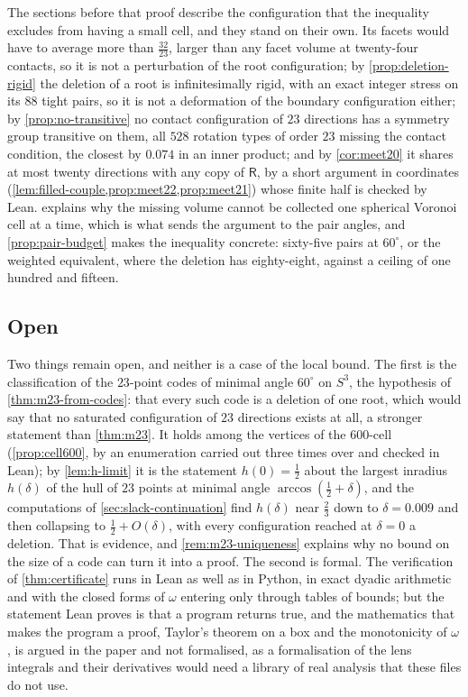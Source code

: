\documentclass[11pt,reqno]{amsart}
\renewcommand{\_}{\origunderscore\allowbreak}
\numberwithin{equation}{section}
\theoremstyle{plain}
\theoremstyle{definition}
\theoremstyle{remark}
\newcommand{\Rt}{\mathsf{R}}                 %
\begin{document}
The sections before that proof describe the configuration that the
inequality excludes from having a small cell, and they stand on their
own. Its facets would have to average more than $\tfrac{32}{23}$, larger
than any facet volume at twenty-four contacts, so it is not a
perturbation of the root configuration; by \cref{prop:deletion-rigid}
the deletion of a root is infinitesimally rigid, with an exact integer
stress on its $88$ tight pairs, so it is not a deformation of the
boundary configuration either; by \cref{prop:no-transitive} no contact
configuration of $23$ directions has a symmetry group transitive on
them, all $528$ rotation types of order $23$ missing the contact
condition, the closest by $0.074$ in an inner product; and by
\cref{cor:meet20} it shares at most twenty directions with any copy of
$\Rt$, by a short argument in coordinates
(\cref{lem:filled-couple,prop:meet22,prop:meet21}) whose finite half is
checked by Lean.  explains why the missing
volume cannot be collected one spherical Voronoi cell at a time, which
is what sends the argument to the pair angles, and \cref{prop:pair-budget}
makes the inequality concrete: sixty-five pairs at $60^\circ$, or the
weighted equivalent, where the deletion has eighty-eight, against a
ceiling of one hundred and fifteen.

\subsection{Open}

Two things remain open, and neither is a case of the local
bound. The first is the classification of the $23$-point codes of
minimal angle $60^\circ$ on $S^3$, the hypothesis of
\cref{thm:m23-from-codes}: that every such code is a deletion of one
root, which would say that no saturated configuration of $23$
directions exists at all, a stronger statement than \cref{thm:m23}. It
holds among the vertices of the $600$-cell (\cref{prop:cell600}, by an
enumeration carried out three times over and checked in Lean); by
\cref{lem:h-limit} it is the statement $h(0)=\tfrac12$ about the
largest inradius $h(\delta)$ of the hull of $23$ points at minimal
angle $\arccos(\tfrac12+\delta)$, and the computations of
\cref{sec:slack-continuation} find $h(\delta)$ near $\tfrac23$ down to
$\delta=0.009$ and then collapsing to $\tfrac12+O(\delta)$, with every
configuration reached at $\delta=0$ a deletion. That is evidence, and
\cref{rem:m23-uniqueness} explains why no bound on the size of a code
can turn it into a proof. The second is formal. The verification of \cref{thm:certificate} runs in
Lean as well as in Python, in exact dyadic arithmetic and with the
closed forms of $\omega$ entering only through tables of bounds; but
the statement Lean proves is that a program returns true, and the
mathematics that makes the program a proof, Taylor's theorem on a box
and the monotonicity of $\omega$, is argued in the paper and not
formalised, as a formalisation of the lens integrals and their
derivatives would need a library of real analysis that these files do
not use.
\end{document}

